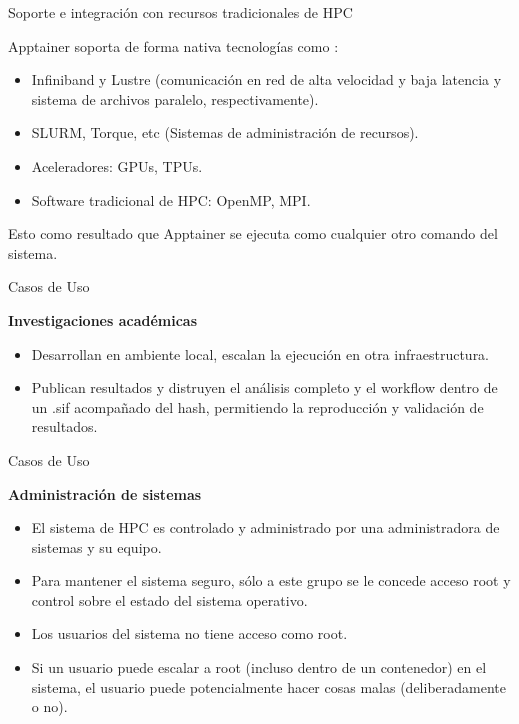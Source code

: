 \documentclass[11pt]{beamer}
\begin{document}
\begin{frame}{Soporte e integración con recursos tradicionales de HPC}

Apptainer soporta de forma nativa tecnologías como :
	\begin{itemize}
		\item Infiniband y Lustre (comunicación en red de alta velocidad y baja latencia y sistema de archivos paralelo, respectivamente).
		\item SLURM, Torque, etc (Sistemas de administración de recursos).
		\item Aceleradores: GPUs, TPUs.
		\item Software tradicional de HPC: OpenMP, MPI. 
	\end{itemize}

Esto como resultado que Apptainer se ejecuta como cualquier otro comando del sistema. 
\end{frame}


\begin{frame}{Casos de Uso}

\textbf{Investigaciones académicas}

\begin{itemize}
	\item Desarrollan en ambiente local, escalan la ejecución en otra infraestructura.
	\item Publican resultados y distruyen el análisis completo y el workflow dentro de un .sif acompañado del hash, permitiendo la reproducción y validación de resultados. 
\end{itemize}
\end{frame}

\begin{frame}{Casos de Uso}

\textbf{Administración de sistemas}

\begin{itemize}
	\item El sistema de HPC es controlado y administrado por una administradora de sistemas y su equipo. 
	\item Para mantener el sistema seguro, sólo a este grupo se le concede acceso root y control sobre el estado del sistema operativo.
	\item Los usuarios del sistema no tiene acceso como root.
	\item Si un usuario puede escalar a root (incluso dentro de un contenedor) en el sistema, el usuario puede potencialmente hacer cosas malas (deliberadamente o no). 
\end{itemize}
\end{frame}
\end{document}
